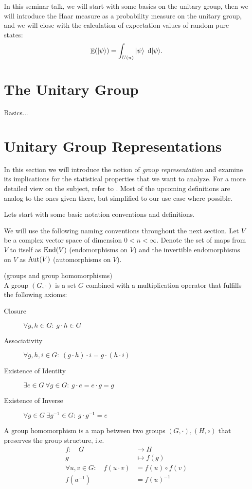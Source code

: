 \documentclass[a4paper,11pt, BCOR=4mm, DIV=12, pagesize]{scrartcl}
\begin{document}
In this seminar talk, we will start with some basics on the unitary group, then 
we will introduce the Haar measure as a probability measure on the unitary 
group, and we will close with the calculation of expectation values of random 
pure states:
\begin{equation}
\mathop{\mathbb{E}}(\ket{\psi}) = \int_{{U(n)}} \ket{\psi}\ \mathrm{d} |\psi\rangle.
\end{equation}

\section{The Unitary Group}\label{sec:ugroup}
Basics... \todo

\section{Unitary Group Representations}
In this section we will introduce the notion of \emph{group representation} and 
examine its implications for the statistical properties that we want to 
analyze. For a more detailed view on the subject, refer to \cite{rep}. Most of 
the upcoming definitions are analog to the ones given there, but simplified to 
our use case where possible. 

Lets start with some basic notation conventions and definitions.

\begin{notation}
 We will use the following naming conventions throughout the next section. Let 
$V$ be a complex vector space of dimension $0<n<\infty$. Denote the set of maps 
from $V$ to itself as $\mathrm{End}(V)$ (endomorphisms on $V$) and the invertible 
endomorphisms on $V$ as $\mathrm{Aut}(V)$ (automorphisms on $V$).
\end{notation}

\begin{definition}(groups and group homomorphisms)\label{def:group}\\
 A group $(G,\cdot)$ is a set $G$ combined with a multiplication operator that 
fulfills the following axioms: 
\begin{description}
 \item[Closure] $\forall g,h\in G:\ g\cdot h\in G$
 \item[Associativity] $\forall g,h,i\in G:\ (g\cdot h)\cdot i = g\cdot (h\cdot 
i)$
 \item[Existence of Identity] $\exists e\in G\ \forall g\in G:\ g\cdot e = 
e\cdot g = g$
 \item[Existence of Inverse] $\forall g\in G\ \exists g^{-1}\in G:\ g\cdot 
g^{-1} = e$
\end{description}
A group homomorphism is a map between two groups $(G,\cdot), (H,\circ)$ that 
preserves the group structure, i.e.
\begin{align*}
 f:\quad G&\to H\\
 g &\mapsto f(g)\\
 \forall u,v\in G:\quad f(u\cdot v) &= f(u)\circ f(v)\\
 f(u^{-1}) &= f(u)^{-1}
\end{align*}

\end{definition}
\end{document}
